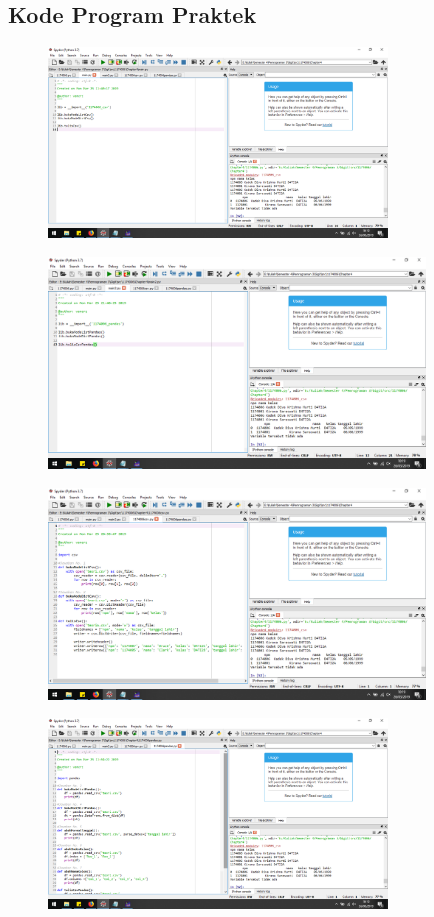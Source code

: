 \subsection{Kode Program Praktek}
\begin{figure}[H]
	\includegraphics[width=9cm]{figures/4/1174006/Praktek/k1.png}
	\centering
\end{figure}
\begin{figure}[H]
	\includegraphics[width=10cm]{figures/4/1174006/Praktek/k2.png}
	\centering
\end{figure}
\begin{figure}[H]
	\includegraphics[width=10cm]{figures/4/1174006/Praktek/k3.png}
	\centering
\end{figure}
\begin{figure}[H]
	\includegraphics[width=9cm]{figures/4/1174006/Praktek/k4.png}
	\centering
\end{figure}
